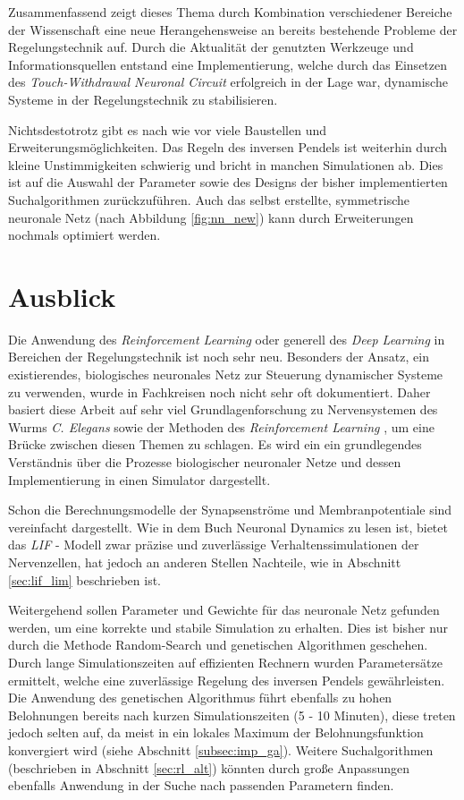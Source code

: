 	Zusammenfassend zeigt dieses Thema durch Kombination verschiedener Bereiche der Wissenschaft eine neue Herangehensweise an bereits bestehende Probleme der Regelungstechnik auf. Durch die Aktualität der genutzten Werkzeuge und Informationsquellen entstand eine Implementierung, welche durch das Einsetzen des \textit{Touch-Withdrawal Neuronal Circuit} \cite{WormLevelRL} erfolgreich in der Lage war, dynamische Systeme in der Regelungstechnik zu stabilisieren.
	
	Nichtsdestotrotz gibt es nach wie vor viele Baustellen und Erweiterungsmöglichkeiten. Das Regeln des inversen Pendels ist weiterhin durch kleine Unstimmigkeiten schwierig und bricht in manchen Simulationen ab. Dies ist auf die Auswahl der Parameter sowie des Designs der bisher implementierten Suchalgorithmen zurückzuführen. Auch das selbst erstellte, symmetrische neuronale Netz (nach Abbildung \ref{fig:nn_new}) kann durch Erweiterungen nochmals optimiert werden.

\section{Ausblick}
\label{sec:erg_ausblick}
	Die Anwendung des \textit{Reinforcement Learning} oder generell des \textit{Deep Learning} in Bereichen der Regelungstechnik ist noch sehr neu. Besonders der Ansatz, ein existierendes, biologisches neuronales Netz zur Steuerung dynamischer Systeme zu verwenden, wurde in Fachkreisen noch nicht sehr oft dokumentiert. Daher basiert diese Arbeit auf sehr viel Grundlagenforschung zu Nervensystemen des Wurms \textit{C. Elegans} \cite{CElegans} sowie der Methoden des \textit{Reinforcement Learning} \cite{DeepLearning} \cite{Russell2016}, um eine Brücke zwischen diesen Themen zu schlagen. Es wird ein ein grundlegendes Verständnis über die Prozesse biologischer neuronaler Netze und dessen Implementierung in einen Simulator dargestellt.
	
	Schon die Berechnungsmodelle der Synapsenströme und Membranpotentiale sind vereinfacht dargestellt. Wie in dem Buch Neuronal Dynamics \cite{NeuronalDynamics} zu lesen ist, bietet das \textit{LIF} - Modell zwar präzise und zuverlässige Verhaltenssimulationen der Nervenzellen, hat jedoch an anderen Stellen Nachteile, wie in Abschnitt \ref{sec:lif_lim} beschrieben ist.
	
	Weitergehend sollen Parameter und Gewichte für das neuronale Netz gefunden werden, um eine korrekte und stabile Simulation zu erhalten. Dies ist bisher nur durch die Methode Random-Search und genetischen Algorithmen geschehen. Durch lange Simulationszeiten auf effizienten Rechnern wurden Parametersätze ermittelt, welche eine zuverlässige Regelung des inversen Pendels gewährleisten. Die Anwendung des genetischen Algorithmus führt ebenfalls zu hohen Belohnungen bereits nach kurzen Simulationszeiten (5 - 10 Minuten), diese treten jedoch selten auf, da meist in ein lokales Maximum der Belohnungsfunktion konvergiert wird (siehe Abschnitt \ref{subsec:imp_ga}). Weitere Suchalgorithmen (beschrieben in Abschnitt \ref{sec:rl_alt}) könnten durch große Anpassungen ebenfalls Anwendung in der Suche nach passenden Parametern finden.
	
